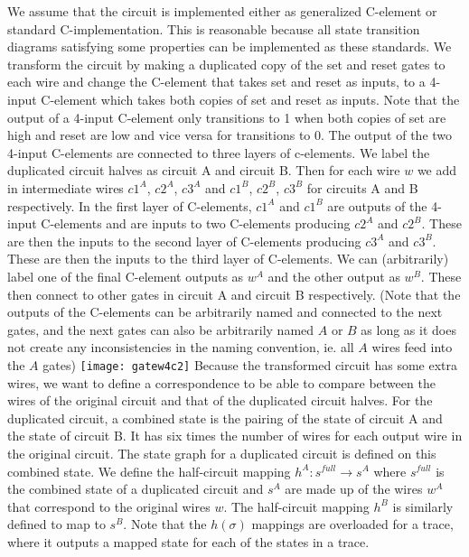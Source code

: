 \documentclass{article}
\begin{document}
We assume that the circuit is implemented either as generalized C-element or standard C-implementation.  This is reasonable because all state transition diagrams satisfying some properties can be implemented as these standards.  We transform the circuit by making a duplicated copy of the set and reset gates to each wire and change the C-element that takes set and reset as inputs, to a 4-input C-element which takes both copies of set and reset as inputs.  Note that the output of a 4-input C-element only transitions to 1 when both copies of set are high and reset are low and vice versa for transitions to 0.  The output of the two 4-input C-elements are connected to three layers of c-elements.  We label the duplicated circuit halves as circuit A and circuit B.  Then for each wire $w$ we add in intermediate wires $c1^A$, $c2^A$, $c3^A$ and $c1^B$, $c2^B$, $c3^B$ for circuits A and B respectively.  In the first layer of C-elements, $c1^A$ and $c1^B$ are outputs of the 4-input C-elements and are inputs to two C-elements producing $c2^A$ and $c2^B$.  These are then the inputs to the second layer of C-elements producing $c3^A$ and $c3^B$.  These are then the inputs to the third layer of C-elements.  We can (arbitrarily) label one of the final C-element outputs as $w^A$ and the other output as $w^B$.  These then connect to other gates in circuit A and circuit B respectively.  (Note that the outputs of the C-elements can be arbitrarily named and connected to the next gates, and the next gates can also be arbitrarily named $A$ or $B$ as long as it does not create any inconsistencies in the naming convention, ie. all $A$ wires feed into the $A$ gates) %
\newline
\texttt{[image: gatew4c2]}
Because the transformed circuit has some extra wires, we want to define a correspondence to be able to compare between the wires of the original circuit and that of the duplicated circuit halves.  For the duplicated circuit, a combined state is the pairing of the state of circuit A and the state of circuit B. It has six times the number of wires for each output wire in the original circuit.  The state graph for a duplicated circuit is defined on this combined state.  We define the half-circuit mapping $h^A: s^{full} \to s^A$ where $s^{full}$ is the combined state of a duplicated circuit and $s^A$ are made up of the wires $w^A$ that correspond to the original wires $w$.  The half-circuit mapping $h^B$ is similarly defined to map to $s^B$.  Note that the $h(\sigma)$ mappings are overloaded for a trace, where it outputs a mapped state for each of the states in a trace.%
\end{document}
